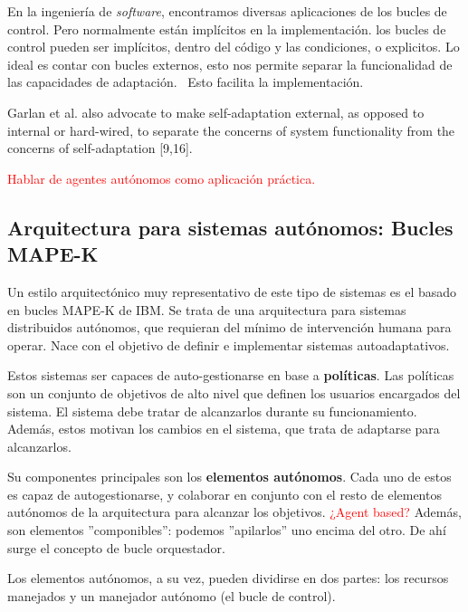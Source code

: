En la ingeniería de \emph{software}, encontramos diversas aplicaciones de los bucles de control. Pero normalmente están implícitos en la implementación. \cite{brunEngineeringSelfAdaptiveSystems2009}
los bucles de control pueden ser implícitos, dentro del código y las condiciones, o explicitos. \cite{brunEngineeringSelfAdaptiveSystems2009} Lo ideal es contar con bucles externos, esto nos permite separar la funcionalidad de las capacidades de adaptación. \ Esto facilita la implementación.

Garlan et al. also advocate to make self-adaptation external, as opposed to internal or hard-wired, to separate the concerns of system
functionality from the concerns of self-adaptation [9,16].

\textcolor{red}{Hablar de agentes autónomos como aplicación práctica. \cite{savaglioAgentbasedInternetThings2020}}

\subsection{Arquitectura para sistemas autónomos: Bucles MAPE-K}

Un estilo arquitectónico muy representativo de este tipo de sistemas es el basado en bucles MAPE-K \cite{ibmcorporationArchitecturalBlueprintAutonomic2006, fonsServiciosAdaptivereadyPara2021} de IBM. Se trata de una arquitectura para sistemas distribuidos autónomos, que requieran del mínimo de intervención humana para operar. Nace con el objetivo de definir e implementar sistemas autoadaptativos.

Estos sistemas ser capaces de auto-gestionarse en base a \textbf{políticas}. Las políticas son un conjunto de objetivos de alto nivel que definen los usuarios encargados del sistema. El sistema debe tratar de alcanzarlos durante su funcionamiento. Además, estos motivan los cambios en el sistema, que trata de adaptarse para alcanzarlos.

Su componentes principales son los \textbf{elementos autónomos}. Cada uno de estos es capaz de autogestionarse, y colaborar en conjunto con el resto de elementos autónomos de la arquitectura para alcanzar los objetivos. \textcolor{red}{¿Agent based?} Además, son elementos ''componibles'': podemos ''apilarlos'' uno encima del otro. De ahí surge el concepto de bucle orquestador.

Los elementos autónomos, a su vez, pueden dividirse en dos partes: los recursos manejados y un manejador autónomo (el bucle de control).


